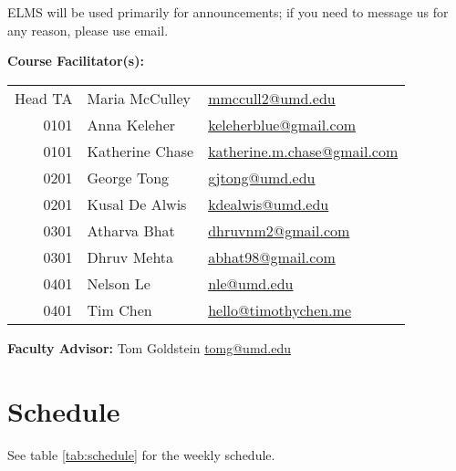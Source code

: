 \documentclass[12pt]{article}
\begin{document}
ELMS will be used primarily for announcements; if you need to message us for any reason,
please use email.

\medskip

\noindent\textbf{Course Facilitator(s): }

\begin{table}[H]
  \begin{tabular}{@{}rll}
    Head TA & Maria McCulley  & \href{mailto:mmccull2@umd.edu}{mmccull2@umd.edu}\\
    0101    & Anna Keleher    & \href{mailto:keleherblue@gmail.com}{keleherblue@gmail.com}\\
    0101    & Katherine Chase & \href{mailto:katherine.m.chase@gmail.com}
                                {katherine.m.chase@gmail.com}\\
    0201    & George Tong     & \href{mailto:gjtong@umd.edu}{gjtong@umd.edu}\\
    0201    & Kusal De Alwis  & \href{mailto:kdealwis@umd.edu}{kdealwis@umd.edu}\\
    0301    & Atharva Bhat    & \href{mailto:dhruvnm2@gmail.com}{dhruvnm2@gmail.com}\\
    0301    & Dhruv Mehta     & \href{mailto:abhat98@gmail.com}{abhat98@gmail.com}\\
    0401    & Nelson Le       & \href{mailto:nle@umd.edu}{nle@umd.edu}\\
    0401    & Tim Chen        & \href{mailto:hello@timothychen.me}{hello@timothychen.me}
  \end{tabular}
\end{table}
\medskip

\noindent\textbf{Faculty Advisor: }Tom Goldstein
\href{mailto:tomg@umd.edu}{tomg@umd.edu} \medskip

\bigskip


\section*{Schedule}
See table \ref{tab:schedule} for the weekly schedule.
\end{document}
